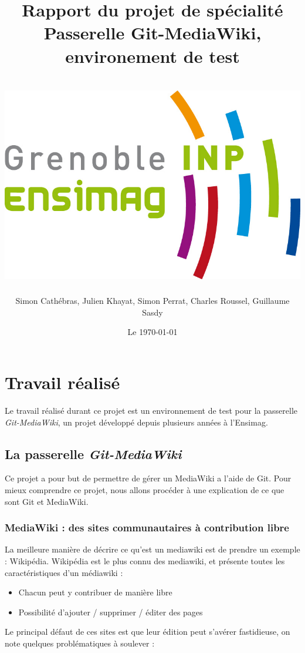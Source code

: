 \documentclass[11pt]{article}
\title{Rapport du projet de spécialité\\
Passerelle Git-MediaWiki, environement de test\\
~\\
\includegraphics[scale=0.75]{logo_ensimag.jpg} 
}
\author{Simon Cathébras, Julien Khayat, Simon Perrat, Charles Roussel, Guillaume Sasdy}
\date{Le \today}
\begin{document}
\maketitle

\section{Travail réalisé}

Le travail réalisé durant ce projet est un environnement de test pour la passerelle \textit{Git-MediaWiki}, un projet développé depuis plusieurs années à l'Ensimag.

\subsection{La passerelle  \textit{Git-MediaWiki}}

Ce projet a pour but de permettre de gérer un MediaWiki a l'aide de Git. Pour mieux comprendre ce projet, nous allons procéder à une explication de ce que sont Git et MediaWiki. 

\subsubsection{MediaWiki : des sites communautaires à contribution libre}

La meilleure manière de décrire ce qu'est un mediawiki est de prendre un exemple : Wikipédia. Wikipédia est le plus connu des mediawiki, et présente toutes les caractéristiques d'un médiawiki : 


\begin{itemize}
\item Chacun peut y contribuer de manière libre
\item Possibilité d'ajouter / supprimer / éditer des pages \\
\end{itemize}

Le principal défaut de ces sites est que leur édition peut s'avérer fastidieuse, on note quelques problématiques à soulever :
\end{document}
